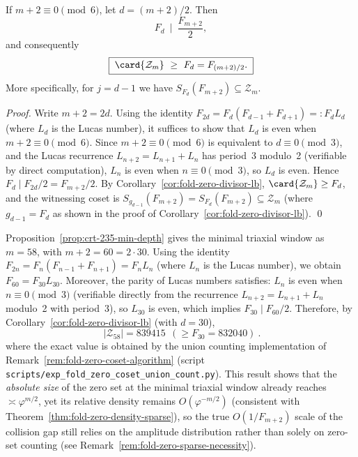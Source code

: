 \begin{corollary}\label{cor:fold-zero-half-index-multiple6}
If \(m+2\equiv 0\pmod 6\), let \(d=(m+2)/2\). Then
\[
F_d\ \mid\ \frac{F_{m+2}}{2},
\]
and consequently
\[
\boxed{\;\card{\mathcal{Z}_m}\ \ge\ F_d=F_{(m+2)/2}.\;}
\]
More specifically, for \(j=d-1\) we have \(S_{F_d}(F_{m+2})\subseteq \mathcal{Z}_m\).
\end{corollary}
\begin{proof}
Write \(m+2=2d\). Using the identity \(F_{2d}=F_d(F_{d-1}+F_{d+1})=:F_dL_d\) (where \(L_d\) is the Lucas number), it suffices to show that \(L_d\) is even when \(m+2\equiv 0\pmod 6\).
Since \(m+2\equiv 0\pmod 6\) is equivalent to \(d\equiv 0\pmod 3\), and the Lucas recurrence \(L_{n+2}=L_{n+1}+L_n\) has period~3 modulo~2 (verifiable by direct computation), \(L_n\) is even when \(n\equiv 0\pmod 3\), so \(L_d\) is even.
Hence \(F_d\mid F_{2d}/2=F_{m+2}/2\). By Corollary~\ref{cor:fold-zero-divisor-lb}, \(\card{\mathcal{Z}_m}\ge F_d\), and the witnessing coset is \(S_{g_{d-1}}(F_{m+2})=S_{F_d}(F_{m+2})\subseteq \mathcal{Z}_m\) (where \(g_{d-1}=F_d\) as shown in the proof of Corollary~\ref{cor:fold-zero-divisor-lb}). \qed
\end{proof}

\begin{remark}[Zero-set increment at the triaxial window: \texorpdfstring{$m=58$}{m=58} yields \texorpdfstring{$|\mathcal{Z}_{58}|=839415$}{|Z58|=839415}]\label{rem:fold-zero-lb-m58}
Proposition~\ref{prop:crt-235-min-depth} gives the minimal triaxial window as \(m=58\), with \(m+2=60=2\cdot 30\).
Using the identity
\(
F_{2n}=F_n(F_{n-1}+F_{n+1})
=F_nL_n
\)
(where \(L_n\) is the Lucas number), we obtain
\(
F_{60}=F_{30}L_{30}
\).
Moreover, the parity of Lucas numbers satisfies: \(L_n\) is even when \(n\equiv 0\pmod 3\)
(verifiable directly from the recurrence \(L_{n+2}=L_{n+1}+L_n\) modulo~2 with period~3),
so \(L_{30}\) is even, which implies
\(
F_{30}\mid F_{60}/2
\).
Therefore, by Corollary~\ref{cor:fold-zero-divisor-lb} (with \(d=30\)),
\[
\boxed{\ |\mathcal{Z}_{58}|=839415\ \ (\ge F_{30}=832040)\ }.
\]
where the exact value is obtained by the union counting implementation of Remark~\ref{rem:fold-zero-coset-algorithm} (script \texttt{scripts/exp\_fold\_zero\_coset\_union\_count.py}).
This result shows that the \emph{absolute size} of the zero set at the minimal triaxial window already reaches \( \asymp \varphi^{m/2}\),
yet its relative density remains \(O(\varphi^{-m/2})\) (consistent with Theorem~\ref{thm:fold-zero-density-sparse}),
so the true \(O(1/F_{m+2})\) scale of the collision gap still relies on the amplitude distribution rather than solely on zero-set counting (see Remark~\ref{rem:fold-zero-sparse-necessity}).
\end{remark}

